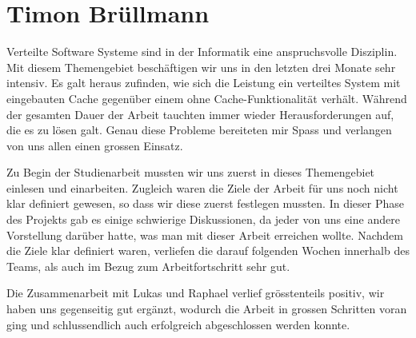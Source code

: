 \section{Timon Brüllmann}

Verteilte Software Systeme sind in der Informatik eine anspruchsvolle Disziplin. Mit diesem Themengebiet beschäftigen wir uns in den letzten drei Monate sehr intensiv. Es galt heraus zufinden, wie sich die Leistung ein verteiltes System mit eingebauten Cache gegenüber einem ohne Cache-Funktionalität verhält. Während der gesamten Dauer der Arbeit tauchten immer wieder Herausforderungen auf, die es zu lösen galt. Genau diese Probleme bereiteten mir Spass und verlangen von uns allen einen grossen Einsatz.


Zu Begin der Studienarbeit mussten wir uns zuerst in dieses Themengebiet einlesen und einarbeiten. Zugleich waren die Ziele der Arbeit für uns noch nicht klar definiert gewesen, so dass wir diese zuerst festlegen mussten. In dieser Phase des Projekts gab es einige schwierige Diskussionen, da jeder von uns eine andere Vorstellung darüber hatte, was man mit dieser Arbeit erreichen wollte. Nachdem die Ziele klar definiert waren, verliefen die darauf folgenden Wochen innerhalb des Teams, als auch im Bezug zum Arbeitfortschritt sehr gut.  


Die Zusammenarbeit mit Lukas und Raphael verlief grösstenteils positiv, wir haben uns gegenseitig gut ergänzt, wodurch die Arbeit in grossen Schritten voran ging und schlussendlich auch erfolgreich abgeschlossen werden konnte.

